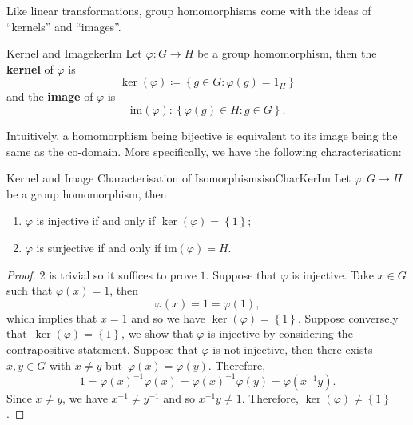 \documentclass[math]{amznotes}
\theoremstyle{remark}
\newcommand{\kernel}[1]{\ker\left(#1\right)}
\newcommand{\img}[1]{\mathrm{im}\left(#1\right)}
\newcommand{\0}{\mathbf{0}}
\newcommand{\1}{\mathbf{1}}
\begin{document}
Like linear transformations, group homomorphisms come with the ideas of ``kernels'' and ``images''.
\begin{dfnbox}{Kernel and Image}{kerIm}
    Let $\varphi \colon G \to H$ be a group homomorphism, then the {\color{red} \textbf{kernel}} of $\varphi$ is 
    \begin{equation*}
        \kernel{\varphi} \coloneqq \left\{g \in G \colon \varphi\left(g\right) = 1_H\right\}
    \end{equation*}
    and the {\color{red} \textbf{image}} of $\varphi$ is 
    \begin{equation*}
        \img{\varphi} \colon \left\{\varphi\left(g\right) \in H \colon g \in G\right\}.
    \end{equation*}
\end{dfnbox}
Intuitively, a homomorphism being bijective is equivalent to its image being the same as the co-domain. More specifically, we have the following characterisation:
\begin{probox}{Kernel and Image Characterisation of Isomorphisms}{isoCharKerIm}
    Let $\varphi \colon G \to H$ be a group homomorphism, then 
    \begin{enumerate}
        \item $\varphi$ is injective if and only if $\kernel{\varphi} = \left\{1\right\}$;
        \item $\varphi$ is surjective if and only if $\img{\varphi} = H$.
    \end{enumerate}
    \tcblower
    \begin{proof}
        $2$ is trivial so it suffices to prove $1$. Suppose that $\varphi$ is injective. Take $x \in G$ such that $\varphi\left(x\right) = 1$, then 
        \begin{equation*}
            \varphi\left(x\right) = 1 = \varphi\left(1\right),
        \end{equation*}
        which implies that $x = 1$ and so we have $\kernel{\varphi} = \left\{1\right\}$. Suppose conversely that~$\kernel{\varphi} = \left\{1\right\}$, we show that $\varphi$ is injective by considering the contrapositive statement. Suppose that $\varphi$ is not injective, then there exists $x, y \in G$ with $x \neq y$ but~$\varphi\left(x\right) = \varphi\left(y\right)$. Therefore,
        \begin{equation*}
            1 = \varphi\left(x\right)^{-1}\varphi\left(x\right) = \varphi\left(x\right)^{-1}\varphi\left(y\right) = \varphi\left(x^{-1}y\right).
        \end{equation*}
        Since $x \neq y$, we have $x^{-1} \neq y^{-1}$ and so $x^{-1}y \neq 1$. Therefore, $\kernel{\varphi} \neq \left\{1\right\}$.
    \end{proof}
\end{probox}
\end{document}
